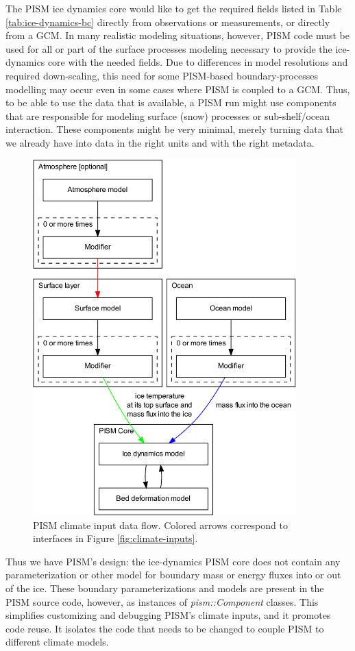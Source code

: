 The PISM ice dynamics core would like to get the required fields listed in Table
\ref{tab:ice-dynamics-bc} directly from observations or measurements, or directly from a GCM.  In many realistic modeling situations, however, PISM code must be used for all or part of the surface processes modeling necessary to provide the ice-dynamics core with the needed fields.  Due to differences in model resolutions and required down-scaling, this need for some PISM-based boundary-processes modelling may occur even in some cases where PISM is coupled to a GCM.  Thus, to be able to use the data that is available, a PISM run might use components that are responsible for modeling surface (snow) processes or sub-shelf/ocean interaction.  These components might be very minimal, merely turning data that we already have into data in the right units and with the right metadata.

\begin{figure}[ht]
  \centering
  \includegraphics[width=4.0in]{figs/data-flow.pdf}
  \caption{PISM climate input data flow. Colored arrows correspond to interfaces in
    Figure \ref{fig:climate-inputs}.}
  \label{fig:climate-input-data-flow}
\end{figure}

Thus we have PISM's design: the ice-dynamics PISM core does not contain any parameterization or other model for boundary mass or energy fluxes into or out of the ice.  These boundary parameterizations and models are present in the PISM source code, however, as instances of \emph{pism::Component} classes.  This simplifies customizing and debugging PISM's climate inputs, and it promotes code reuse.  It isolates the code that needs to be changed to couple PISM to different climate models.


